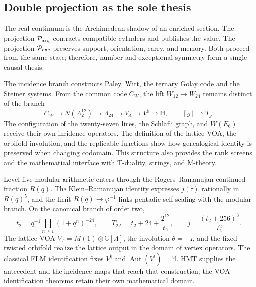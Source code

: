 \subsection*{Double projection as the sole thesis}

The real continuum is the Archimedean shadow of an enriched section. The
projection \(\mathcal P_{\rm arq}\) contracts compatible cylinders and publishes
the value. The projection \(\mathcal P_{\rm exc}\) preserves support,
orientation, carry, and memory. Both proceed from the same state; therefore,
number and exceptional symmetry form a single causal thesis.

The incidence branch constructs Paley, Witt, the ternary Golay code and
the Steiner systems. From the common code \(C_W\), the lift
\(W_{12}\to W_{24}\) remains distinct of the branch
\[
 C_W\to N(A_2^{12})\to\Lambda_{24}\to
 V_\Lambda\to V^\natural\to\mathbb M,
 \qquad [g]\longmapsto T_g.
\]
The configuration of the twenty-seven lines, the Schläfli graph, and
\(W(E_6)\) receive their own incidence operators. The definition of the
lattice VOA, the orbifold involution, and the replicable functions show
how genealogical identity is preserved when changing codomain. This
structure also provides the rank screens and the mathematical
interface with T-duality, strings, and M-theory.

Level-five modular arithmetic enters through the
Rogers--Ramanujan continued fraction \(R(q)\). The Klein--Ramanujan identity expresses
\(j(\tau)\) rationally in \(R(q)^5\), and the limit
\(R(q)\to\varphi^{-1}\) links pentadic self-scaling with the modular branch.
On the canonical branch of order two,
\[
 t_2=q^{-1}\prod_{n\ge1}(1+q^n)^{-24},\qquad
 T_{2A}=t_2+24+\frac{2^{12}}{t_2},
 \qquad j=\frac{(t_2+256)^3}{t_2^2}.
\]
The lattice VOA \(V_\Lambda=M(1)\otimes\mathbb C[\Lambda]\), the involution \(\theta=-I\), and the fixed--twisted orbifold realize the lattice output in the domain of vertex operators. The classical FLM identification fixes \(V^\natural\) and \(\operatorname{Aut}(V^\natural)=\mathbb M\). HMT supplies the antecedent and the incidence maps that reach that construction; the VOA identification theorems retain their own mathematical domain.

